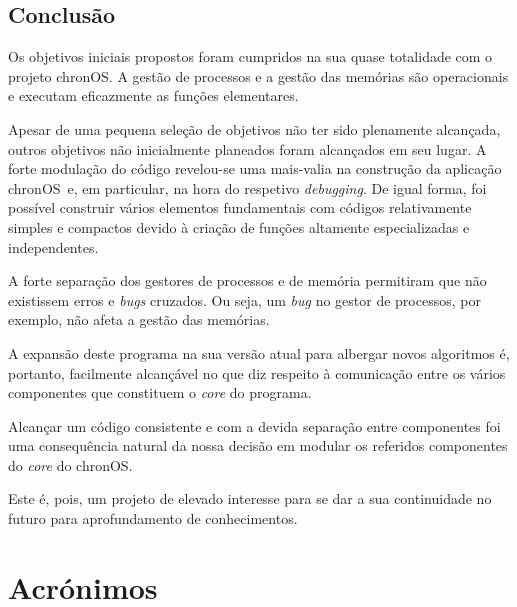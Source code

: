 \documentclass[10pt,oneside]{estiloUBI}
\newcommand{\chronOS}{\textsf{chronOS}}
\begin{document}
	
	\section{Conclusão}
	
	Os objetivos iniciais propostos foram cumpridos na sua quase totalidade com o projeto \chronOS. A gestão de processos e a gestão das memórias são operacionais e executam eficazmente as funções elementares.
	
	Apesar de uma pequena seleção de objetivos não ter sido plenamente alcançada, outros objetivos não inicialmente planeados foram alcançados em seu lugar. A forte modulação do código revelou-se uma mais-valia na construção da aplicação \chronOS~e, em particular, na hora do respetivo \textit{debugging}. De igual forma, foi possível construir vários elementos fundamentais com códigos relativamente simples e compactos devido à criação de funções altamente especializadas e independentes.
	
	A forte separação dos gestores de processos e de memória permitiram que não existissem erros e \textit{bugs} cruzados. Ou seja, um \textit{bug} no gestor de processos, por exemplo, não afeta a gestão das memórias.
	
	A expansão deste programa na sua versão atual para albergar novos algoritmos é, portanto, facilmente alcançável no que diz respeito à comunicação entre os vários componentes que constituem o \textit{core} do programa.
	
	Alcançar um código consistente e com a devida separação entre componentes foi uma consequência natural da nossa decisão em modular os referidos componentes do \textit{core} do \chronOS.
	
	Este é, pois, um projeto de elevado interesse para se dar a sua continuidade no futuro para aprofundamento de conhecimentos.
	
	
	\chapter*{Acrónimos}
    \label{sec:acron}
    
    \begin{acronym}[FCFS]
    \end{acronym}
	
\end{document}
